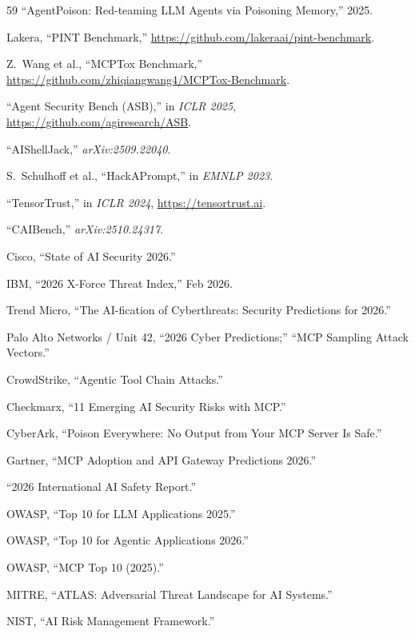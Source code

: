 \documentclass[11pt,letterpaper]{article}
\begin{document}
\begin{thebibliography}{59}
``AgentPoison: Red-teaming LLM Agents via Poisoning Memory,'' 2025.

Lakera, ``PINT Benchmark,'' \url{https://github.com/lakeraai/pint-benchmark}.

Z.~Wang et al., ``MCPTox Benchmark,'' \url{https://github.com/zhiqiangwang4/MCPTox-Benchmark}.

``Agent Security Bench (ASB),'' in \textit{ICLR 2025}, \url{https://github.com/agiresearch/ASB}.

``AIShellJack,'' \textit{arXiv:2509.22040}.

S.~Schulhoff et al., ``HackAPrompt,'' in \textit{EMNLP 2023}.

``TensorTrust,'' in \textit{ICLR 2024}, \url{https://tensortrust.ai}.

``CAIBench,'' \textit{arXiv:2510.24317}.

Cisco, ``State of AI Security 2026.''

IBM, ``2026 X-Force Threat Index,'' Feb 2026.

Trend Micro, ``The AI-fication of Cyberthreats: Security Predictions for 2026.''

Palo Alto Networks / Unit 42, ``2026 Cyber Predictions;'' ``MCP Sampling Attack Vectors.''

CrowdStrike, ``Agentic Tool Chain Attacks.''

Checkmarx, ``11 Emerging AI Security Risks with MCP.''

CyberArk, ``Poison Everywhere: No Output from Your MCP Server Is Safe.''

Gartner, ``MCP Adoption and API Gateway Predictions 2026.''

``2026 International AI Safety Report.''

OWASP, ``Top 10 for LLM Applications 2025.''

OWASP, ``Top 10 for Agentic Applications 2026.''

OWASP, ``MCP Top 10 (2025).''

MITRE, ``ATLAS: Adversarial Threat Landscape for AI Systems.''

NIST, ``AI Risk Management Framework.''


\end{thebibliography}
\end{document}
